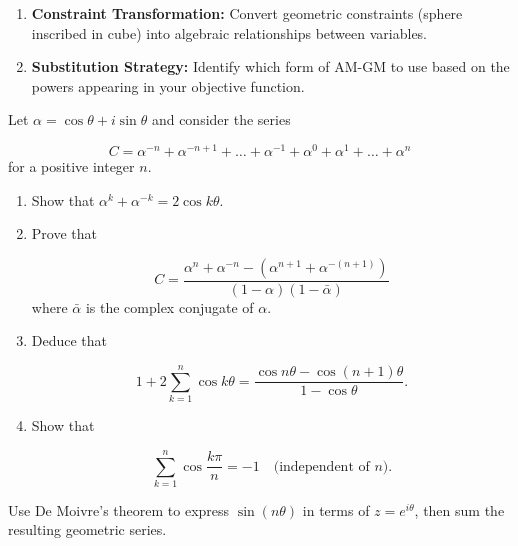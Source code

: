 \begin{takeaways}
\begin{enumerate}
    \item \textbf{Constraint Transformation:} Convert geometric constraints (sphere inscribed in cube) into algebraic relationships between variables.
    \item \textbf{Substitution Strategy:} Identify which form of AM-GM to use based on the powers appearing in your objective function.
\end{enumerate}
\end{takeaways}

\begin{problem}
Let $\alpha = \cos\theta + i \sin\theta$ and consider the series 

\[ 
C = \alpha^{-n} + \alpha^{-n+1} + \dots + \alpha^{-1} + \alpha^0 + \alpha^1 + \dots + \alpha^n 
\] for a positive integer $n$.

\begin{enumerate}[label=(\roman*)]
    \item Show that $\alpha^k + \alpha^{-k} = 2 \cos k\theta$.
    \item Prove that 
    
    \[
    C = \frac{\alpha^n + \alpha^{-n} - (\alpha^{n+1} + \alpha^{-(n+1)})}{(1-\alpha)(1-\bar{\alpha})}
    \]
    where $\bar{\alpha}$ is the complex conjugate of $\alpha$.

    \item Deduce that 
    
    \[
    1 + 2\sum_{k=1}^n \cos k\theta 
    = \frac{\cos n\theta - \cos (n+1)\theta}{1 - \cos\theta}.
    \]

    \item Show that 
    
    \[ 
    \sum_{k=1}^n \cos \frac{k\pi}{n} = -1 \quad \text{(independent of $n$)}.
    \]
\end{enumerate}
\end{problem}

\begin{hint}
Use De Moivre's theorem to express $\sin(n\theta)$ in terms of $z = e^{i\theta}$, then sum the resulting geometric series.
\end{hint}

